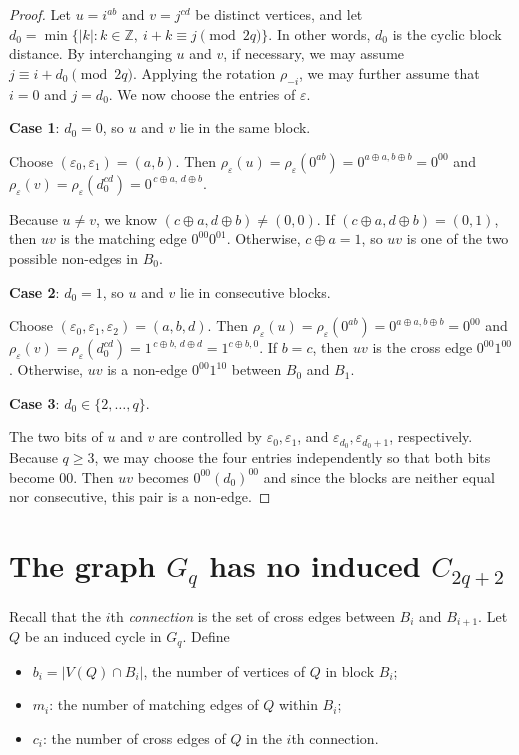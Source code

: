 \documentclass[11pt]{article}
\theoremstyle{definition}
\theoremstyle{remark}
\begin{document}
\begin{proof}
Let $u=i^{ab}$ and $v=j^{cd}$ be distinct vertices, and let  $d_0=
\min\{|k|:k\in\mathbb Z,\ i+k\equiv j\pmod{2q}\}$.
In other words, $d_0$ is the cyclic block distance. 
By interchanging $u$ and $v$, if necessary, we may assume $j\equiv i+d_0\pmod{2q}$.
Applying the rotation $\rho_{-i}$, we may further assume that
$i=0$ and $j=d_0$.
We now choose the entries of $\varepsilon$.

\textbf{Case 1}: $d_0=0$, so $u$ and $v$ lie in the same block.

Choose $(\varepsilon_0, \varepsilon_1)=(a,b)$.
Then $\rho_\varepsilon(u)=\rho_\varepsilon(0^{ab})=0^{a\oplus a, b\oplus b}=0^{00}$ and $\rho_\varepsilon(v)=\rho_\varepsilon(d_0^{cd})=0^{\,c\oplus a,\,d\oplus b}$.

Because $u\ne v$, we know $(c\oplus a, d\oplus b)\neq(0,0)$.
If $(c\oplus a, d\oplus b)=(0, 1)$, then  $uv$ is the matching edge $0^{00}0^{01}$.
Otherwise, $c\oplus a=1$, so $uv$ is one of the two possible non-edges in $B_0$. 

\textbf{Case 2}: $d_0=1$, so $u$ and $v$ lie in consecutive blocks.

Choose $(\varepsilon_0,  \varepsilon_1, \varepsilon_2)=(a,b,d)$.
Then $\rho_\varepsilon(u)=\rho_\varepsilon(0^{ab})=0^{a\oplus a, b\oplus b}=0^{00}$ and $\rho_\varepsilon(v)=\rho_\varepsilon(d_0^{cd})=1^{\,c\oplus b,\,d\oplus d}=1^{c\oplus b, 0}$.
If $b=c$, then $uv$ is the cross edge $0^{00}1^{00}$.
Otherwise, $uv$ is a non-edge $0^{00}1^{10}$ between $B_0$ and $B_1$. 

\textbf{Case 3}: $d_0\in\{2, \ldots,  q\}$. 

The two bits of $u$ and $v$ are controlled by $\varepsilon_0,\varepsilon_1$, and $\varepsilon_{d_0},\varepsilon_{d_0+1}$, respectively. 
Because $q\ge3$, we may choose the four entries independently so that both bits become $00$.  
Then $uv$ becomes $0^{00}(d_0)^{00}$ and since the blocks are neither equal nor consecutive, this pair is a non-edge.
\end{proof}

\section{The graph $G_q$ has no induced $C_{2q+2}$}
\label{sec:nocycle}

Recall that the $i$th \emph{connection} is the set of cross edges between $B_i$ and $B_{i+1}$.  
Let $Q$ be an induced cycle in $G_q$.  
Define
\begin{itemize}
\item $b_i=|V(Q)\cap B_i|$, the number of vertices of $Q$ in block $B_i$;
\item $m_i$: the number of matching edges of $Q$ within $B_i$;
\item $c_i$: the number of cross edges of $Q$ in the $i$th connection.
\end{itemize}
\end{document}
